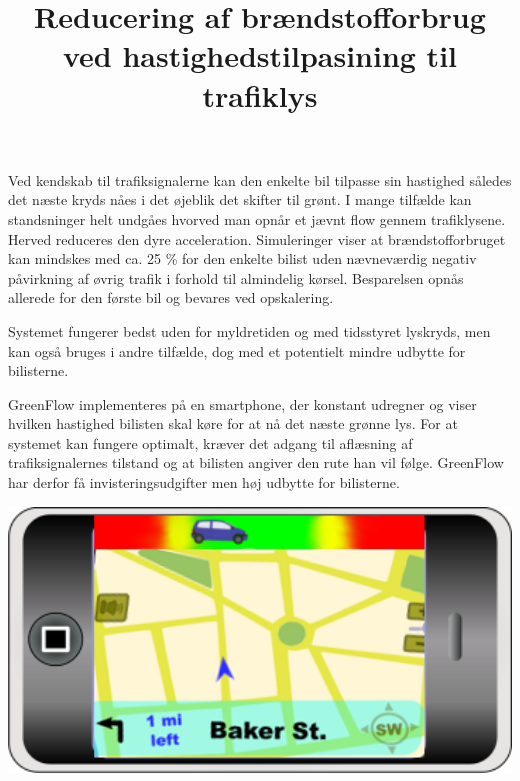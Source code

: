 \documentclass{article}
\title{Reducering af brændstofforbrug ved hastighedstilpasining til trafiklys}
\date{}
\begin{document}
\maketitle

\noindent Ved kendskab til trafiksignalerne kan den enkelte bil tilpasse sin hastighed således det næste kryds nåes i det øjeblik det skifter til grønt.
I mange tilfælde kan standsninger helt undgåes hvorved man opnår et jævnt flow gennem trafiklysene.
Herved reduceres den dyre acceleration.
Simuleringer viser at brændstofforbruget kan mindskes med ca. 25 \% for den enkelte bilist uden nævneværdig negativ påvirkning af øvrig trafik i forhold til almindelig kørsel.
Besparelsen opnås allerede for den første bil og bevares ved opskalering.

\noindent Systemet fungerer bedst uden for myldretiden og med tidsstyret lyskryds, men kan også bruges i andre tilfælde, dog med et potentielt mindre udbytte for bilisterne.

\noindent GreenFlow implementeres på en smartphone, der konstant udregner og viser hvilken hastighed bilisten skal køre for at nå det næste grønne lys.
For at systemet kan fungere optimalt, kræver det adgang til aflæsning af trafiksignalernes tilstand og at bilisten angiver den rute han vil følge.
GreenFlow har derfor få invisteringsudgifter men høj udbytte for bilisterne.

\vspace{15mm}
\includegraphics[width=1\textwidth]{images/product.png}


\end{document}
